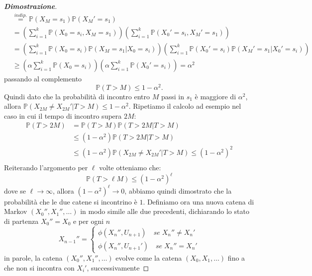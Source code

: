 \documentclass{article}
\theoremstyle{definition}
\theoremstyle{definition}
\theoremstyle{remark}
\begin{document}
\begin{proof}[\textbf{Dimostrazione}]
\begin{align*}
                           & \overset{indip.}{=} \mathbb{P}(X_M = s_1) \mathbb{P}(X_M'=s_1)                                                                                                  \\
                           & =\left(\sum_{i=1}^k \mathbb{P}(X_0 = s_i, X_M = s_1)\right)\left(\sum_{i=1}^k \mathbb{P}(X_0' = s_i, X_M' = s_1)\right)                                         \\
                           & =\left(\sum_{i=1}^k \mathbb{P}(X_0 = s_i)\mathbb{P}(X_M =s_1|X_0 = s_i)\right)\left(\sum_{i=1}^k \mathbb{P}(X_0' = s_i)\mathbb{P}(X_M' = s_1| X_0' =s_i)\right) \\
                           & \ge \left(\alpha\sum_{i= 1}^k\mathbb{P}(X_0 =s_i)\right)\left(\alpha\sum_{i= 1}^k\mathbb{P}(X_0'=s_i)\right) = \alpha^2
    \end{align*}
    passando al complemento
    $$\mathbb{P}(T>M) \le 1-\alpha^2.$$
    Quindi dato che la probabilità di incontro entro $M$ passi in $s_1$ è maggiore di $\alpha^2$, allora  $\mathbb{P}(X_{2M} \neq X_{2M}' | T>M)\le 1-\alpha^2$.
    Ripetiamo il calcolo ad esempio nel caso in cui il tempo di incontro supera $2M$:
    \begin{align*}
        \mathbb{P}(T>2M) & = \mathbb{P}(T>M)\mathbb{P}(T>2M| T>M)                              \\
                         & \le(1-\alpha^2)\mathbb{P}(T>2M|T>M)                                 \\
                         & \le(1-\alpha^2)\mathbb{P}(X_{2M}\neq X_{2M}'|T>M)\le (1-\alpha^2)^2 \\
    \end{align*}
    Reiterando l'argomento per $\ell$ volte otteniamo che:
    $$\mathbb{P}(T>\ell M)\le (1-\alpha^2)^{\ell}$$
    dove se $\ell\to\infty$, allora $(1-\alpha^2)^{\ell}\to 0$, abbiamo quindi dimostrato che la probabilità che  le due catene si incontrino è $1$.
    Definiamo ora una nuova catena di Markov $(X_0'',X_1'',\dots)$ in modo simile alle due precedenti, dichiarando lo stato di partenza $X_0'' = X_0$ e per ogni $n$
    $$X_{n-1}'' =\left\{\begin{array}{cl}
            \phi(X_n'',U_{n+1})\quad se\;X_n'' \neq X_n' \\
            \phi(X_n'',U_{n+1}')\quad se\;X_n'' = X_n'
        \end{array}\right.$$
    in parole, la catena $(X_0'',X_1'',\dots)$ evolve come la catena $(X_0,X_1,\dots)$ fino a che non si incontra con $X_i'$, successivamente

\end{proof}
\end{document}
